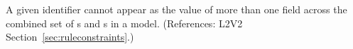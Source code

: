 A given identifier cannot appear as the value of more than one
 field across the combined set of \AssignmentRule{}s and
\RateRule{}s in a model.  (References: L2V2
Section~\ref{sec:ruleconstraints}.)
